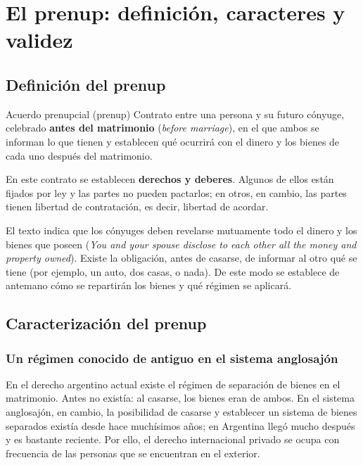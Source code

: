 \documentclass[12pt,oneside]{book}
\begin{document}
\chapter[El prenup: definición y validez]{El prenup: definición, caracteres y validez}

\section{Definición del prenup}

\begin{definition}{Acuerdo prenupcial (prenup)}
Contrato entre una persona y su futuro cónyuge, celebrado \textbf{antes del matrimonio} (\textit{before marriage}), en el que ambos se informan lo que tienen y establecen qué ocurrirá con el dinero y los bienes de cada uno después del matrimonio.
\end{definition}

En este contrato se establecen \textbf{derechos y deberes}. Algunos de ellos están fijados por ley y las partes no pueden pactarlos; en otros, en cambio, las partes tienen libertad de contratación, es decir, libertad de acordar.

El texto indica que los cónyuges deben revelarse mutuamente todo el dinero y los bienes que poseen (\textit{You and your spouse disclose to each other all the money and property owned}). Existe la obligación, antes de casarse, de informar al otro qué se tiene (por ejemplo, un auto, dos casas, o nada). De este modo se establece de antemano cómo se repartirán los bienes y qué régimen se aplicará.

\section{Caracterización del prenup}

\subsection{Un régimen conocido de antiguo en el sistema anglosajón}

En el derecho argentino actual existe el régimen de separación de bienes en el matrimonio. Antes no existía: al casarse, los bienes eran de ambos. En el sistema anglosajón, en cambio, la posibilidad de casarse y establecer un sistema de bienes separados existía desde hace muchísimos años; en Argentina llegó mucho después y es bastante reciente. Por ello, el derecho internacional privado se ocupa con frecuencia de las personas que se encuentran en el exterior.
\end{document}
